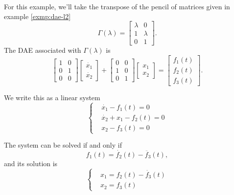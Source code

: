 \pagebreak
\begin{example} \label{exmp:dae-l2T}
    For this example, we'll take the transpose of the pencil of matrices given in example \ref{exmp:dae-l2}
    \[
        \Gamma(\lambda) =
        \begin{bmatrix}
            \lambda & 0 \\
            1 & \lambda \\
            0 & 1
        \end{bmatrix}.
    \]
    The DAE associated with \(\Gamma(\lambda)\) is
    \[
        \begin{bmatrix}
            1 & 0 \\
            0 & 1 \\
            0 & 0
        \end{bmatrix}
        \begin{bmatrix}
            \dot{x_{1}} \\
            \dot{x_{2}}
        \end{bmatrix} + 
        \begin{bmatrix}
            0 & 0 \\
            1 & 0 \\
            0 & 1
        \end{bmatrix}
        \begin{bmatrix}
            x_{1} \\
            x_{2}
        \end{bmatrix}=
        \begin{bmatrix}
            f_{1}(t) \\
            f_{2}(t) \\
            f_{3}(t)
        \end{bmatrix}.
    \]

    We write this as a linear system
    \begin{equation*}
        \left\{
            \begin{aligned}
                & \dot{x_{1}} - f_{1}(t) = 0 \\
                & \dot{x_{2}} + x_{1} - f_{2}(t) = 0 \\
                & x_{2} - f_{3}(t) = 0
            \end{aligned}
        \right.
    \end{equation*}

    The system can be solved if and only if
    \[
        f_{1}(t) = \dot{f_{2}}(t) - \ddot{f_{3}}(t),
    \]
    and its solution is
    \begin{equation*}
        \left\{
            \begin{aligned}
                & x_{1} = f_{2}(t) - \dot{f_{3}}(t) \\
                & x_{2} = f_{3}(t)
            \end{aligned}
        \right.
    \end{equation*}
\end{example}
